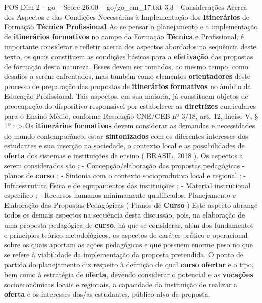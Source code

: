 \begin{textsample}{POS Dim 2 – go – Score 26.00 – go/go\_em\_17.txt}  \label{ex:f2_pos_175}
3.3 - Considerações Acerca dos Aspectos e das Condições Necessárias à Implementação dos \textbf{Itinerários} de Formação \textbf{Técnica} \textbf{Profissional} Ao se pensar o planejamento e a implementação de \textbf{itinerários} \textbf{formativos} no campo da Formação \textbf{Técnica} e Profissional, é importante considerar e refletir acerca dos aspectos abordados na sequência deste texto, os quais constituem as condições básicas para a \textbf{efetivação} das propostas de formação desta natureza.
Esses devem ser tomados, ao mesmo tempo, como desafios a serem enfrentados, mas também como elementos \textbf{orientadores} deste processo de preparação das propostas de \textbf{itinerários} \textbf{formativos} no âmbito da Educação Profissional.
Tais aspectos, em sua maioria, já constituem objetos de preocupação do dispositivo responsável por estabelecer as \textbf{diretrizes} curriculares para o Ensino Médio, conforme Resolução CNE/CEB nº 3/18, art. 12, Inciso V, § 1º : > Os \textbf{itinerários} \textbf{formativos} devem considerar as demandas e necessidades do mundo contemporâneo, estar \textbf{sintonizados} com os diferentes interesses dos estudantes e sua inserção na sociedade, o contexto local e as possibilidades de \textbf{oferta} dos sistemas e instituições de ensino ( BRASIL, 2018 ).
Os aspectos a serem considerados são : - Concepção/elaboração das propostas pedagógicas - planos de \textbf{curso} ; - Sintonia com o contexto socioprodutivo local e regional ; - Infraestrutura física e de equipamentos das instituições ; - Material instrucional específico ; - Recursos humanos minimamente qualificados.
Planejamento e Elaboração das Propostas Pedagógicas ( Planos de \textbf{Curso} ) Este aspecto abrange todos os demais aspectos na sequência desta discussão, pois, na elaboração de uma proposta pedagógica de \textbf{curso}, há que se considerar, além dos fundamentos e princípios teórico-metodológicos, os aspectos de caráter prático e operacional sobre os quais aportam as ações pedagógicas e que possuem enorme peso no que se refere à viabilidade da implementação da proposta pretendida.
O ponto de partida do planejamento diz respeito à definição de qual \textbf{curso} \textbf{ofertar} e o tipo, bem como à estratégia de \textbf{oferta}, devendo considerar o potencial e as \textbf{vocações} socioeconômicas locais e regionais, a capacidade da instituição de realizar a \textbf{oferta} e os interesses dos/as estudantes, público-alvo da proposta.

\end{textsample}
